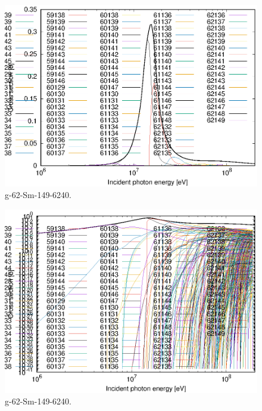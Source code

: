\begin{figure}
 \includegraphics[width=\linewidth]{eps/g_62-Sm-149_6240.eps}
  \caption{g-62-Sm-149-6240.}
\end{figure}
\begin{figure}
 \includegraphics[width=\linewidth]{eps-log/g_62-Sm-149_6240.eps}
 \caption{g-62-Sm-149-6240.}
\end{figure}
\newpage \clearpage

